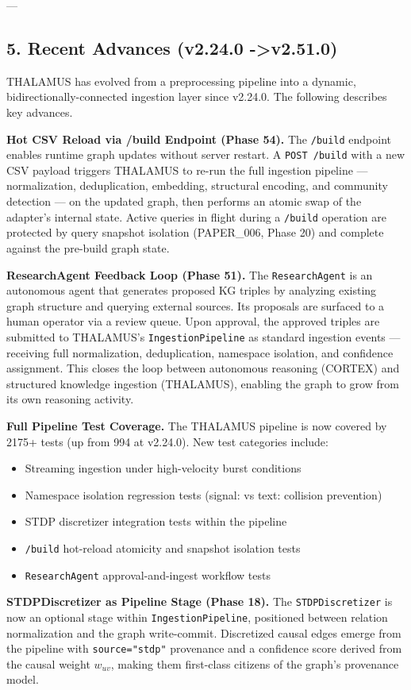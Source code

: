 ---

\subsection{5. Recent Advances (v2.24.0 -\textgreater  v2.51.0)}

THALAMUS has evolved from a prepr\-ocessing pipeline into a dynamic, bidir\-ectionally-connected ingestion layer since v2.24.0. The following describes key advances.

\textbf{Hot CSV Reload via /build Endpoint (Phase 54).} The \texttt{/build} endpoint enables runtime graph updates without server restart. A \texttt{POST /build} with a new CSV payload triggers THALAMUS to re-run the full ingestion pipeline — norma\-lization, dedup\-lication, embedding, structural encoding, and community detection — on the updated graph, then performs an atomic swap of the adapter's internal state. Active queries in flight during a \texttt{/build} operation are protected by query snapshot isolation (PAPER\_006, Phase 20) and complete against the pre-build graph state.

\textbf{ResearchAgent Feedback Loop (Phase 51).} The \texttt{ResearchAgent} is an autonomous agent that generates proposed KG triples by analyzing existing graph structure and querying external sources. Its proposals are surfaced to a human operator via a review queue. Upon approval, the approved triples are submitted to THALAMUS's \texttt{IngestionPipeline} as standard ingestion events — receiving full norma\-lization, dedup\-lication, namespace isolation, and confidence assignment. This closes the loop between autonomous reasoning (CORTEX) and structured knowledge ingestion (THALAMUS), enabling the graph to grow from its own reasoning activity.

\textbf{Full Pipeline Test Coverage.} The THALAMUS pipeline is now covered by 2175+ tests (up from 994 at v2.24.0). New test categories include:
\begin{itemize}
\item Streaming ingestion under high-velocity burst conditions
\item Namespace isolation regression tests (signal: vs text: collision prevention)
\item STDP discretizer integration tests within the pipeline
\item \texttt{/build} hot-reload atomicity and snapshot isolation tests
\item \texttt{ResearchAgent} approval-and-ingest workflow tests

\end{itemize}
\textbf{STDPDiscre\-tizer as Pipeline Stage (Phase 18).} The \texttt{STDPDiscretizer} is now an optional stage within \texttt{IngestionPipeline}, positioned between relation norma\-lization and the graph write-commit. Discretized causal edges emerge from the pipeline with \texttt{source="stdp"} provenance and a confidence score derived from the causal weight $w_{uv}$, making them first-class citizens of the graph's provenance model.

